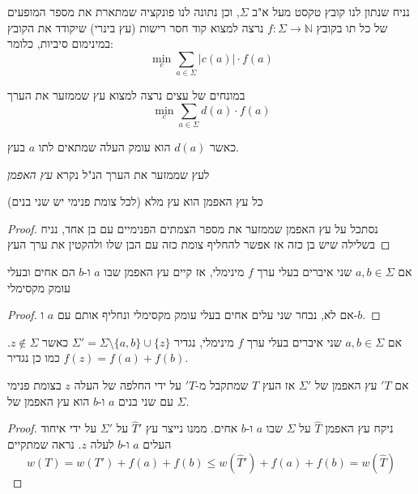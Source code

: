 נניח שנתון לנו קובץ טקסט מעל א"ב
$\Sigma$,
וכן נתונה לנו פונקציה שמתארת את מספר המופעים של כל תו בקובץ
$f:\Sigma \to \mathbb{N}$
נרצה למצוא קוד חסר רישות (עץ בינרי) שיקודד את הקובץ במינימום סיביות, כלומר:
$$
\min_c \sum_{a \in \Sigma}|c(a)| \cdot f(a)
$$

במונחים של עצים נרצה למצוא עץ שממזער את הערך
$$
\min_c \sum_{a \in \Sigma}d(a) \cdot f(a)
$$

כאשר 
$d(a)$
הוא עומק העלה שמתאים לתו $a$ בעץ.

לעץ שממזער את הערך הנ"ל נקרא 
\emph{עץ האפמן}

\begin{claim}
כל עץ האפמן הוא עץ מלא (לכל צומת פנימי יש שני בנים)
\end{claim}

\begin{proof}
נסתכל על עץ האפמן שממזער את מספר הצמתים הפנימיים עם בן אחד,
נניח בשלילה שיש בן כזה
אז אפשר להחליף צומת כזה עם הבן שלו ולהקטין את ערך העץ
\end{proof}

\begin{claim}
אם 
$a,b \in \Sigma$
שני איברים בעלי ערך 
$f$
מינימלי, 
אז קיים עץ האפמן שבו $a$ ו-$b$ הם אחים ובעלי עומק מקסימלי
\end{claim}

\begin{proof}
אם לא, נבחר שני עלים אחים בעלי עומק מקסימלי ונחליף אותם עם $a$ ו-$b$.
\end{proof}

\begin{lemma}
\label{lemma:union}
אם 
$a,b \in \Sigma$
שני איברים בעלי ערך 
$f$
מינימלי, 
נגדיר 
$\Sigma' = \Sigma \setminus \{a,b\} \cup \{z\}$
כאשר
$z \notin \Sigma$.
כמו כן נגדיר
$f(z) = f(a) + f(b)$.

אם $'T$ עץ האפמן של 
$\Sigma'$
אז העץ $T$ שמתקבל מ-$'T$ על ידי החלפה של העלה $z$ בצומת פנימי עם שני בנים $a$ ו-$b$ הוא עץ
האפמן של 
$\Sigma$.
\end{lemma}

\begin{proof}
ניקח עץ האפמן
$\hat{T}$
על 
$\Sigma$
שבו $a$ ו-$b$ אחים.
ממנו נייצר עץ 
$\hat{T}'$
על 
$\Sigma'$
על ידי איחוד העלים $a$ ו-$b$ לעלה $z$.
נראה שמתקיים 
$$
w(T) = w(T') + f(a) + f(b) \leq w(\hat{T}') + f(a) + f(b) = w(\hat{T})
$$

\end{proof}

